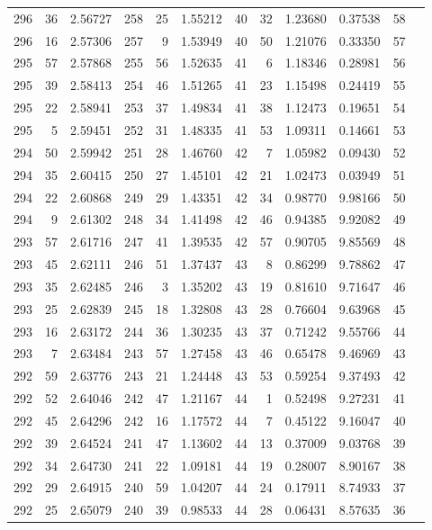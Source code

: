 \documentclass[12pt,a4paper]{article}
\begin{document}
\begin{small}
\begin{longtable}{@{}rrr|rrr|rrr|rrr@{}}
296 & 36 & 2.56727 & 258 & 25 & 1.55212 & 40 & 32 & 1.23680 & 0.37538 & 58 \\
296 & 16 & 2.57306 & 257 & 9 & 1.53949 & 40 & 50 & 1.21076 & 0.33350 & 57 \\
295 & 57 & 2.57868 & 255 & 56 & 1.52635 & 41 & 6 & 1.18346 & 0.28981 & 56 \\
295 & 39 & 2.58413 & 254 & 46 & 1.51265 & 41 & 23 & 1.15498 & 0.24419 & 55 \\
295 & 22 & 2.58941 & 253 & 37 & 1.49834 & 41 & 38 & 1.12473 & 0.19651 & 54 \\
295 & 5 & 2.59451 & 252 & 31 & 1.48335 & 41 & 53 & 1.09311 & 0.14661 & 53 \\
294 & 50 & 2.59942 & 251 & 28 & 1.46760 & 42 & 7 & 1.05982 & 0.09430 & 52 \\
294 & 35 & 2.60415 & 250 & 27 & 1.45101 & 42 & 21 & 1.02473 & 0.03949 & 51 \\
294 & 22 & 2.60868 & 249 & 29 & 1.43351 & 42 & 34 & 0.98770 & 9.98166 & 50 \\
294 & 9 & 2.61302 & 248 & 34 & 1.41498 & 42 & 46 & 0.94385 & 9.92082 & 49 \\
293 & 57 & 2.61716 & 247 & 41 & 1.39535 & 42 & 57 & 0.90705 & 9.85569 & 48 \\
293 & 45 & 2.62111 & 246 & 51 & 1.37437 & 43 & 8 & 0.86299 & 9.78862 & 47 \\
293 & 35 & 2.62485 & 246 & 3 & 1.35202 & 43 & 19 & 0.81610 & 9.71647 & 46 \\
293 & 25 & 2.62839 & 245 & 18 & 1.32808 & 43 & 28 & 0.76604 & 9.63968 & 45 \\
293 & 16 & 2.63172 & 244 & 36 & 1.30235 & 43 & 37 & 0.71242 & 9.55766 & 44 \\
293 & 7 & 2.63484 & 243 & 57 & 1.27458 & 43 & 46 & 0.65478 & 9.46969 & 43 \\
292 & 59 & 2.63776 & 243 & 21 & 1.24448 & 43 & 53 & 0.59254 & 9.37493 & 42 \\
292 & 52 & 2.64046 & 242 & 47 & 1.21167 & 44 & 1 & 0.52498 & 9.27231 & 41 \\
292 & 45 & 2.64296 & 242 & 16 & 1.17572 & 44 & 7 & 0.45122 & 9.16047 & 40 \\
292 & 39 & 2.64524 & 241 & 47 & 1.13602 & 44 & 13 & 0.37009 & 9.03768 & 39 \\
292 & 34 & 2.64730 & 241 & 22 & 1.09181 & 44 & 19 & 0.28007 & 8.90167 & 38 \\
292 & 29 & 2.64915 & 240 & 59 & 1.04207 & 44 & 24 & 0.17911 & 8.74933 & 37 \\
292 & 25 & 2.65079 & 240 & 39 & 0.98533 & 44 & 28 & 0.06431 & 8.57635 & 36 \\

\end{longtable}
\end{small}
\end{document}

